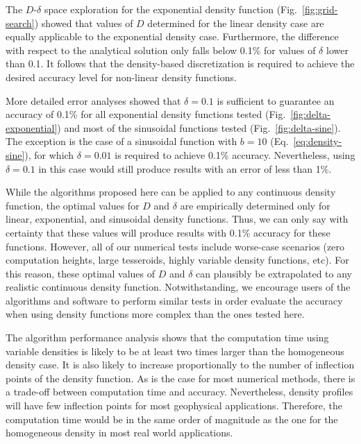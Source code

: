 \documentclass[extra, referee]{gji}
\begin{document}
The $D$-$\delta$ space exploration for the exponential density function
(Fig.~\ref{fig:grid-search}) showed that values of $D$ determined for the linear density
case are equally applicable to the exponential density case.
Furthermore, the difference with respect to the analytical solution only falls below
0.1\% for values of $\delta$ lower than 0.1.
It follows that the density-based discretization is required to achieve the desired
accuracy level for non-linear density functions.

More detailed error analyses showed that $\delta = 0.1$ is sufficient to guarantee an
accuracy of 0.1\% for all exponential density functions tested
(Fig.~\ref{fig:delta-exponential})
and most of the sinusoidal functions tested (Fig.~\ref{fig:delta-sine}).
The exception is the case of a sinusoidal function with $b = 10$
(Eq.~\ref{eq:density-sine}), for which $\delta = 0.01$ is required to achieve 0.1\%
accuracy.
Nevertheless, using $\delta = 0.1$ in this case would still produce results with an
error of less than 1\%.

While the algorithms proposed here can be applied to any continuous density function,
the optimal values for $D$ and $\delta$ are empirically determined only for linear,
exponential, and sinusoidal density functions.
Thus, we can only say with certainty that these values will produce results with 0.1\%
accuracy for these functions.
However, all of our numerical tests include worse-case scenarios (zero computation
heights, large tesseroids, highly variable density functions, etc).
For this reason, these optimal values of $D$ and $\delta$ can plausibly be
extrapolated to any realistic continuous density function.
Notwithstanding, we encourage users of the algorithms and software to perform similar
tests in order evaluate the accuracy when using density functions more complex than the
ones tested here.

The algorithm performance analysis shows that the computation time using variable
densities is likely to be at least two times larger than the homogeneous density case.
It is also likely to increase proportionally to the number of inflection points of the
density function.
As is the case for most numerical methods, there is a trade-off between computation time
and accuracy.
Nevertheless, density profiles will have few inflection points for most geophysical
applications.
Therefore, the computation time would be in the same order of
magnitude as the one for the homogeneous density in most real world applications.
\end{document}
